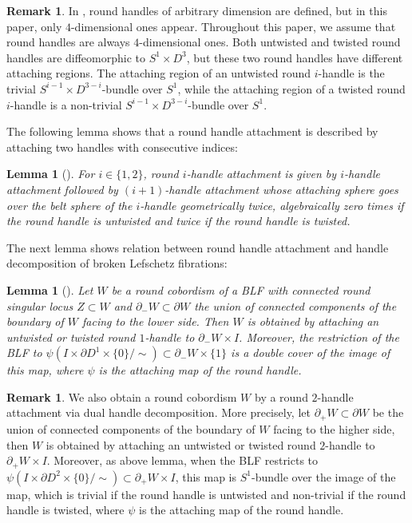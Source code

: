 \documentclass{amsart}
\theoremstyle{plain}
\newtheorem{lem}[thm]{Lemma}
\theoremstyle{definition}
\newtheorem{rem}[thm]{Remark}
\begin{document}
\begin{rem}
In \cite{Ba2}, round handles of arbitrary dimension are defined, but in this paper, only $4$-dimensional ones appear. 
Throughout this paper, we assume that round handles are always $4$-dimensional ones. 
Both untwisted and twisted round handles are diffeomorphic to $S^1\times D^3$, but these two round handles have different attaching regions. 
The attaching region of an untwisted round $i$-handle is the trivial $S^{i-1}\times D^{3-i}$-bundle over $S^1$, 
while the attaching region of a twisted round $i$-handle is a non-trivial $S^{i-1}\times D^{3-i}$-bundle over $S^1$. 
\end{rem}

The following lemma shows that a round handle attachment is described by attaching two handles with consecutive indices: 

\begin{lem}[\cite{Ba2}]\label{decomposition of round handles}
For $i\in\{1,2\}$, round $i$-handle attachment is given by $i$-handle attachment followed by $(i+1)$-handle attachment 
whose attaching sphere goes over the belt sphere of the $i$-handle geometrically twice, algebraically zero times if the round handle is untwisted and twice if the round handle is twisted.
\end{lem}

The next lemma shows relation between round handle attachment and handle decomposition of broken Lefschetz fibrations:

\begin{lem}[\cite{Ba2}]\label{round cobordisms}
Let $W$ be a round cobordism of a BLF with connected round singular locus $Z\subset W$ and 
$\partial_{-}W\subset \partial W$ the union of connected components of the boundary of $W$ facing to the lower side. 
Then $W$ is obtained by attaching an untwisted or twisted round $1$-handle to $\partial_{-}W\times I$. 
Moreover, the restriction of the BLF to $\psi(I\times\partial D^1\times\{0\}/\sim)\subset\partial_{-}W\times\{1\}$ is a double cover of the image of this map, 
where $\psi$ is the attaching map of the round handle. 
\end{lem}

\begin{rem}\label{dual decomp.}
We also obtain a round cobordism $W$ by a round $2$-handle attachment via dual handle decomposition. 
More precisely, let $\partial_{+}W\subset\partial W$ be the union of connected components of the boundary of $W$ facing to the higher side, 
then $W$ is obtained by attaching an untwisted or twisted round $2$-handle to $\partial_{+}W\times I$. 
Moreover, as above lemma, when the BLF restricts to $\psi(I\times\partial D^2\times\{0\}/\sim)\subset\partial_{+}W\times I$, 
this map is $S^1$-bundle over the image of the map, which is trivial if the round handle is untwisted and non-trivial if the round handle is twisted, 
where $\psi$ is the attaching map of the round handle. 
\end{rem}
\end{document}
